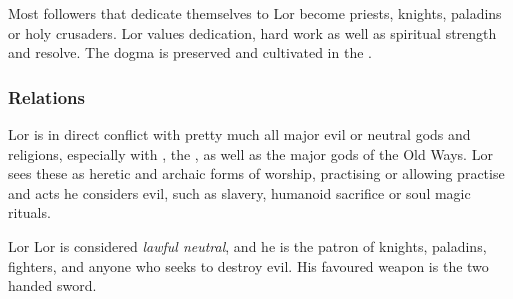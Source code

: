 Most followers that dedicate themselves to Lor become priests, knights,
paladins or holy crusaders. Lor values dedication, hard work as well as
spiritual strength and resolve. The dogma is preserved and cultivated in the
.

\subsubsection{Relations}

Lor is in direct conflict with pretty much all major evil or neutral gods and
religions, especially with , the ,
as well as the major gods of the Old Ways. Lor sees these as heretic and
archaic forms of worship, practising or allowing practise and acts he considers
evil, such as slavery, humanoid sacrifice or soul magic rituals.

\begin{35e}{Lor}
  Lor is considered \emph{lawful neutral}, and he is the patron of knights,
  paladins, fighters, and anyone who seeks to destroy evil. His favoured
  weapon is the two handed sword.
\end{35e}
